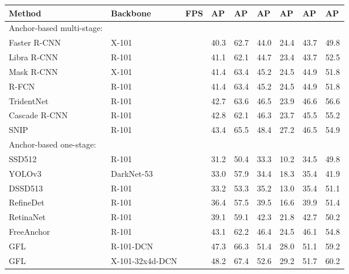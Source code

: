 \begin{table*}[tpb]
    \begin{center}
        \begin{tabular}{ K{11.0em} | K{8.0em} |K{2.5em} | K{4.2em} K{4.2em} K{4.2em} | K{4.2em} K{4.2em} K{4.2em} } 
            \hline
             Method  & Backbone & FPS & AP &  AP &  AP & AP & AP & AP \\
            \hline
             Anchor-based multi-stage: &    &  & &  &  &  &\\ 
             Faster R-CNN~\cite{fasterRCNN} & X-101 & & 40.3 & 62.7 & 44.0 & 24.4 & 43.7 & 49.8  \\
             Libra R-CNN~\cite{libraRCNN} & R-101 & & 41.1 & 62.1 & 44.7 & 23.4 & 43.7 & 52.5  \\
             Mask R-CNN~\cite{maskRCNN} & X-101 &  & 41.4 & 63.4 & 45.2 & 24.5 & 44.9 & 51.8  \\
             R-FCN~\cite{RFCN} & R-101 &  & 41.4 & 63.4 & 45.2 & 24.5 & 44.9 & 51.8  \\
             TridentNet~\cite{TridentNet} & R-101  &  & 42.7 & 63.6 & 46.5 & 23.9 & 46.6 & 56.6  \\
             Cascade R-CNN~\cite{cascadeRCNN} & R-101 &  & 42.8 & 62.1 & 46.3 & 23.7 & 45.5 & 55.2  \\
             SNIP~\cite{SNIP} & R-101 &  & 43.4 & 65.5 & 48.4 & 27.2 & 46.5 & 54.9  \\
             
             
             \hline
             Anchor-based one-stage: &    &  &  &  &  &\\
             SSD512~\cite{SSD} & R-101 &  & 31.2 & 50.4 & 33.3 & 10.2 & 34.5 & 49.8 \\
             YOLOv3~\cite{YOLOv3} & DarkNet-53 &  & 33.0 & 57.9 & 34.4 & 18.3 & 35.4 & 41.9  \\
             DSSD513~\cite{DSSD} & R-101 &  & 33.2 & 53.3 & 35.2 & 13.0 & 35.4 & 51.1 \\
             RefineDet~\cite{refineDet} & R-101 &  & 36.4 & 57.5 & 39.5 & 16.6 & 39.9 & 51.4 \\
             RetinaNet~\cite{retinaNet} & R-101 &  & 39.1 & 59.1 & 42.3 & 21.8 & 42.7 & 50.2 \\
             FreeAnchor~\cite{freeAnchor} & R-101 &  & 43.1 & 62.2 & 46.4 & 24.5 & 46.1 & 54.8 \\
             GFL~\cite{GFL} & R-101-DCN &  & 47.3 & 66.3 & 51.4 & 28.0 & 51.1 & 59.2  \\
             GFL~\cite{GFL} & X-101-32x4d-DCN &  & 48.2 & 67.4 & 52.6 & 29.2 & 51.7 & 60.2  \\
             

\end{tabular}
\end{center}
\end{table*}
